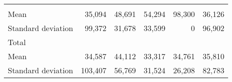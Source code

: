 \begin{tabular}{llllll}
  \multicolumn{1}{r}{} &
  \multicolumn{1}{r}{} &
  \multicolumn{1}{r}{} &
  \multicolumn{1}{r}{} \\
\multicolumn{1}{l}{\hspace{4em}Mean} &
  \multicolumn{1}{|r}{35,094} &
  \multicolumn{1}{r}{48,691} &
  \multicolumn{1}{r}{54,294} &
  \multicolumn{1}{r}{98,300} &
  \multicolumn{1}{r}{36,126} \\
\multicolumn{1}{l}{\hspace{4em}Standard deviation} &
  \multicolumn{1}{|r}{99,372} &
  \multicolumn{1}{r}{31,678} &
  \multicolumn{1}{r}{33,599} &
  \multicolumn{1}{r}{0} &
  \multicolumn{1}{r}{96,902} \\
\multicolumn{1}{l}{\hspace{3em}Total} &
  \multicolumn{1}{|r}{} &
  \multicolumn{1}{r}{} &
  \multicolumn{1}{r}{} &
  \multicolumn{1}{r}{} &
  \multicolumn{1}{r}{} \\
\multicolumn{1}{l}{\hspace{4em}Mean} &
  \multicolumn{1}{|r}{34,587} &
  \multicolumn{1}{r}{44,112} &
  \multicolumn{1}{r}{33,317} &
  \multicolumn{1}{r}{34,761} &
  \multicolumn{1}{r}{35,810} \\
\multicolumn{1}{l}{\hspace{4em}Standard deviation} &
  \multicolumn{1}{|r}{103,407} &
  \multicolumn{1}{r}{56,769} &
  \multicolumn{1}{r}{31,524} &
  \multicolumn{1}{r}{26,208} &
  \multicolumn{1}{r}{82,783} \\
\cline{1-6}
\end{tabular}


